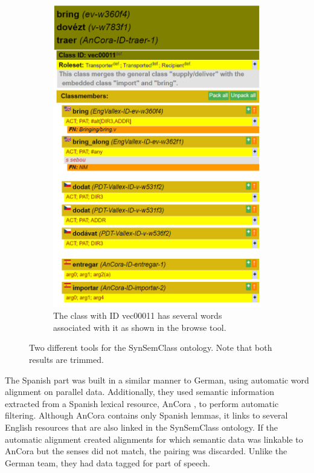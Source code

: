 \begin{figure}[t]
\begin{subfigure}[t]{0.49\textwidth}
\centering
\includegraphics[width=0.9\linewidth]{img/synsemclass_class}
\caption{The class with ID vec00011 has several words associated with it as shown in the browse tool.\footnotemark}
\label{fig:synsemclass-browse}
\end{subfigure}
\caption{Two different tools for the SynSemClass ontology. Note that both results are trimmed.}
\label{fig:synsemclass-tools}
\end{figure}

\addtocounter{footnote}{-1}
\addtocounter{footnote}{1}

The Spanish part \parencite{SSC_Spanish} was built in a similar manner to German, using automatic word alignment on parallel data. Additionally, they used semantic information extracted from a Spanish lexical resource, AnCora \parencite{taule-etal-2008-ancora}, to perform automatic filtering. Although AnCora contains only Spanish lemmas, it links to several English resources that are also linked in the SynSemClass ontology. If the automatic alignment created alignments for which semantic data was linkable to AnCora but the senses did not match, the pairing was discarded. Unlike the German team, they had data tagged for part of speech.

